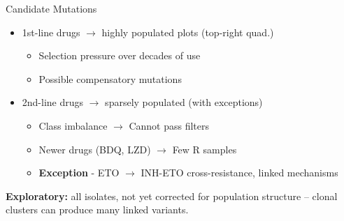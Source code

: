 \documentclass[pdf]{beamer} %
\begin{document}
\begin{frame}{Candidate Mutations}
  \begin{itemize}
    \item 1st-line drugs $\rightarrow$ highly populated plots (top-right quad.)
      \begin{itemize}
        \item Selection pressure over decades of use
        \item Possible compensatory mutations 
      \end{itemize}
    \item 2nd-line drugs $\rightarrow$ sparsely populated (with exceptions)
      \begin{itemize}
        \item Class imbalance $\rightarrow$ Cannot pass filters
        \item Newer drugs (BDQ, LZD) $\rightarrow$ Few R samples
        \item \textbf{Exception} - ETO $\rightarrow$ INH-ETO cross-resistance, linked mechanisms
      \end{itemize}
  \end{itemize}
  \vfill
  {\footnotesize \textbf{Exploratory:} all isolates, not yet corrected for population structure -- clonal clusters can produce many linked variants.}
\end{frame}
\end{document}
